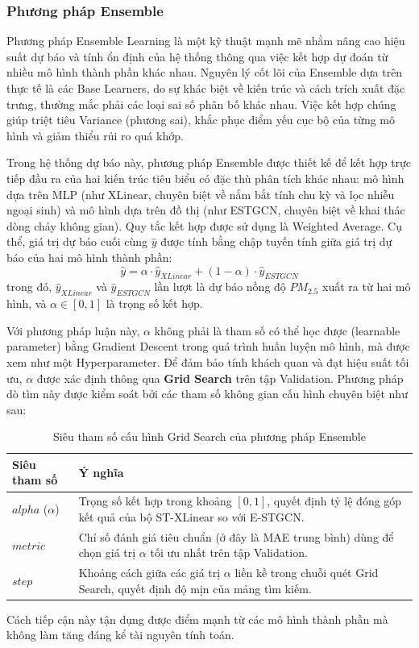 \subsubsection{Phương pháp Ensemble}

Phương pháp Ensemble Learning là một kỹ thuật mạnh mẽ nhằm nâng cao hiệu suất dự báo và tính ổn định của hệ thống thông qua việc kết hợp dự đoán từ nhiều mô hình thành phần khác nhau. Nguyên lý cốt lõi của Ensemble dựa trên thực tế là các Base Learners, do sự khác biệt về kiến trúc và cách trích xuất đặc trưng, thường mắc phải các loại sai số phân bố khác nhau. Việc kết hợp chúng giúp triệt tiêu Variance (phương sai), khắc phục điểm yếu cục bộ của từng mô hình và giảm thiểu rủi ro quá khớp.

Trong hệ thống dự báo này, phương pháp Ensemble được thiết kế để kết hợp trực tiếp đầu ra của hai kiến trúc tiêu biểu có đặc thù phân tích khác nhau: mô hình dựa trên MLP (như XLinear, chuyên biệt về nắm bắt tính chu kỳ và lọc nhiễu ngoại sinh) và mô hình dựa trên đồ thị (như ESTGCN, chuyên biệt về khai thác dòng chảy không gian). Quy tắc kết hợp được sử dụng là Weighted Average. Cụ thể, giá trị dự báo cuối cùng $\hat{y}$ được tính bằng chập tuyến tính giữa giá trị dự báo của hai mô hình thành phần:
\begin{equation}
    \hat{y} = \alpha \cdot \hat{y}_{XLinear} + (1-\alpha) \cdot \hat{y}_{ESTGCN}
\end{equation}
trong đó, $\hat{y}_{XLinear}$ và $\hat{y}_{ESTGCN}$ lần lượt là dự báo nồng độ $PM_{2.5}$ xuất ra từ hai mô hình, và $\alpha \in [0, 1]$ là trọng số kết hợp.

Với phương pháp luận này, $\alpha$ không phải là tham số có thể học được (learnable parameter) bằng Gradient Descent trong quá trình huấn luyện mô hình, mà được xem như một Hyperparameter. Để đảm bảo tính khách quan và đạt hiệu suất tối ưu, $\alpha$ được xác định thông qua \textbf{Grid Search} trên tập Validation. Phương pháp dò tìm này được kiểm soát bởi các tham số không gian cấu hình chuyên biệt như sau:
\begin{table}[H]
\centering
\caption{Siêu tham số cấu hình Grid Search của phương pháp Ensemble}
\label{tab:ensemble_params}
\renewcommand{\arraystretch}{1.3}
\begin{tabular}{p{3.8cm} p{10.5cm}}
\toprule
\textbf{Siêu tham số} & \textbf{Ý nghĩa} \\
\midrule
$alpha$ ($\alpha$) & Trọng số kết hợp trong khoảng $[0, 1]$, quyết định tỷ lệ đóng góp kết quả của bộ ST-XLinear so với E-STGCN. \\
$metric$ & Chỉ số đánh giá tiêu chuẩn (ở đây là MAE trung bình) dùng để chọn giá trị $\alpha$ tối ưu nhất trên tập Validation. \\
$step$ & Khoảng cách giữa các giá trị $\alpha$ liền kề trong chuỗi quét Grid Search, quyết định độ mịn của mảng tìm kiếm. \\
\bottomrule
\end{tabular}
\end{table}
Cách tiếp cận này tận dụng được điểm mạnh từ các mô hình thành phần mà không làm tăng đáng kể tài nguyên tính toán.

